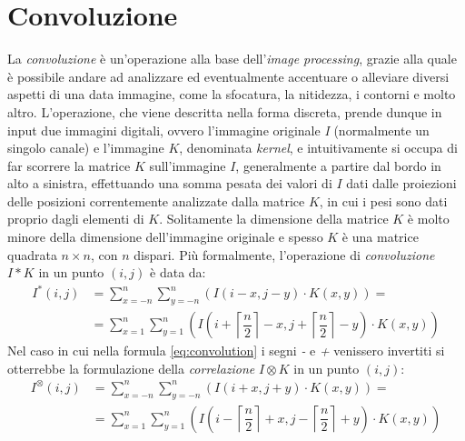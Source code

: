 \section{Convoluzione}
\label{sec:math-convolution}
La \textit{convoluzione} \`e un'operazione alla base dell'\textit{image processing}, grazie alla quale \`e possibile andare ad analizzare ed eventualmente accentuare o alleviare diversi aspetti di una data immagine, come la sfocatura, la nitidezza, i contorni e molto altro. L'operazione, che viene descritta nella forma discreta, prende dunque in input due immagini digitali, ovvero l'immagine originale \textit{I} (normalmente un singolo canale) e l'immagine $K$, denominata \textit{kernel}, e intuitivamente si occupa di far scorrere la matrice $K$ sull'immagine $I$, generalmente a partire dal bordo in alto a sinistra, effettuando una somma pesata dei valori di $I$ dati dalle proiezioni delle posizioni correntemente analizzate dalla matrice $K$, in cui i pesi sono dati proprio dagli elementi di $K$. Solitamente la dimensione della matrice $K$ \`e molto minore della dimensione dell'immagine originale e spesso $K$ \`e una matrice quadrata $n\times n$, con $n$ dispari. Pi\`u formalmente, l'operazione di \textit{convoluzione} $I * K$ in un punto $(i,j)$ \`e data da:
\begin{equation}
	\label{eq:convolution}
	\begin{split}
		I^{*}(i, j) & = \sum_{x = -n}^{n}\sum_{y = -n}^{n}(I(i-x, j-y)\cdot K(x,y))=\\
		& = \sum_{x = 1}^{n}\sum_{y = 1}^{n}(I(i + \left\lceil{\dfrac{n}{2}}\right\rceil - x, j + \left\lceil{\dfrac{n}{2}}\right\rceil - y)\cdot K(x,y))
	\end{split}
\end{equation}
Nel caso in cui nella formula \ref{eq:convolution} i segni \textit{-} e \textit{+} venissero invertiti si otterrebbe la formulazione della \textit{correlazione} $I \otimes K$ in un punto $(i,j)$:
\begin{equation}
	\label{eq:correlation}
	\begin{split}
		I^{\otimes}(i, j) & = \sum_{x = -n}^{n}\sum_{y = -n}^{n}(I(i+x, j+y)\cdot K(x,y))=\\
		& = \sum_{x = 1}^{n}\sum_{y = 1}^{n}(I(i - \left\lceil{\dfrac{n}{2}}\right\rceil + x, j - \left\lceil{\dfrac{n}{2}}\right\rceil + y)\cdot K(x,y))
	\end{split}
\end{equation}
